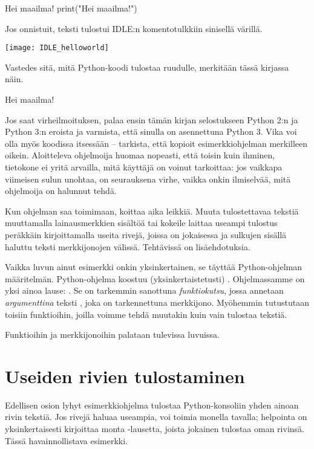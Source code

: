 \begin{example}{Hei maailma!}
print("Hei maailma!")
\end{example}

Jos onnistuit, teksti  tulostui IDLE:n komentotulkkiin sinisellä värillä.

\texttt{[image: IDLE\_helloworld]}

Vastedes sitä, mitä Python-koodi tulostaa ruudulle, merkitään tässä kirjassa näin.

\begin{output}
Hei maailma!
\end{output}

Jos saat virheilmoituksen, palaa ensin tämän kirjan selostukseen Python 2:n ja Python 3:n eroista ja varmista, että sinulla on asennettuna Python 3. Vika voi olla myös koodissa itsessään -- tarkista, että kopioit esimerkkiohjelman merkilleen oikein. Aloitteleva ohjelmoija huomaa nopeasti, että toisin kuin ihminen, tietokone ei yritä arvailla, mitä käyttäjä on voinut tarkoittaa: jos vaikkapa viimeisen sulun unohtaa, on seurauksena virhe, vaikka onkin ilmiselvää, mitä ohjelmoija on halunnut tehdä.

Kun ohjelman saa toimimaan, koittaa aika leikkiä. Muuta tulostettavaa tekstiä muuttamalla lainausmerkkien sisältöä tai kokeile laittaa useampi tulostus peräkkäin kirjoittamalla useita rivejä, joissa on jokaisessa  ja sulkujen sisällä haluttu teksti merkkijonojen välissä. Tehtävissä on lisäehdotuksia.

Vaikka luvun ainut esimerkki onkin yksinkertainen, se täyttää Python-ohjelman määritelmän. Python-ohjelma koostuu (yksinkertaistetusti) . Ohjelmassamme on yksi ainoa lause: . Se on tarkemmin sanottuna \textit{funktiokutsu}, jossa   annetaan \textit{argumenttina} teksti , joka on tarkennettuna \gls{merkkijono}. Myöhemmin tutustutaan toisiin funktioihin, joilla voimme tehdä muutakin kuin vain tulostaa tekstiä.

Funktioihin ja merkkijonoihin palataan tulevissa luvuissa.

\section{Useiden rivien tulostaminen}

Edellisen osion lyhyt esimerkkiohjelma tulostaa Python-konsoliin yhden ainoan rivin tekstiä. Jos rivejä haluaa useampia, voi toimia monella tavalla; helpointa on yksinkertaisesti kirjoittaa monta -lausetta, joista jokainen tulostaa oman rivinsä. Tässä havainnollistava esimerkki.

